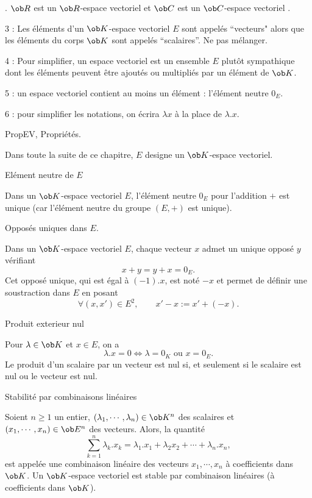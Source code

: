 \Exemple. $\ob R$ est un $\ob R$-espace vectoriel  et  $\ob C$ est un $\ob C$-espace vectoriel . 

\bigskip

\Remarque{} 3 : Les \'el\'ements d'un $\ob K$-espace vectoriel $E$ sont appel\'es ``vecteurs" alors que les \'el\'ements du corps $\ob K$ sont appel\'es ``scalaires''. Ne pas m\'elanger. 
\bigskip

\Remarque{} 4 : Pour simplifier, un espace vectoriel est un ensemble $E$ plut\^ot sympathique dont les \'el\'ements peuvent \^etre ajout\'es ou multipli\'es 
par un \'el\'ement de $\ob K$. 
\bigskip

\Remarque{} 5 : un espace vectoriel contient au moins un \'el\'ement : l'\'el\'ement neutre $0_E$. 
\bigskip

\Remarque{} 6 : pour simplifier les notations, on \'ecrira $\lambda x$ \`a la place de $\lambda.x$. 
\bigskip

\Subsection PropEV, Propri\'et\'es.
\bigskip

\noindent
Dans toute la suite de ce chapitre, $E$ designe un $\ob K$-espace vectoriel. 

\Concept [] El\'ement neutre de $E$

\noindent
Dans un $\ob K$-espace vectoriel $E$, l'\'el\'ement neutre $0_E$ pour l'addition $+$ est unique (car l'\'el\'ement neutre du groupe $(E,+)$ est unique). 

\Concept [] Oppos\'es uniques dans $E$. 

\noindent
Dans un $\ob K$-espace vectoriel $E$, chaque vecteur $x$ admet un unique oppos\'e $y$ v\'erifiant $$
x+y=y+x=0_E.
$$ 
Cet oppos\'e unique, qui est \'egal \`a $(-1).x$, est not\'e $-x$ et permet de d\'efinir une soustraction dans $E$ en posant
$$
\forall (x,x')\in E^2, \qquad x'-x:=x'+(-x).
$$

\Concept [] Produit exterieur nul

\noindent
Pour $\lambda\in\ob K$ et $x\in E$, on a 
$$
{
\lambda.x=0\Longleftrightarrow \lambda=0_K\mbox{ ou }x=0_E}. 
$$
Le produit d'un scalaire par un vecteur est nul si, et seulement si le scalaire est nul ou le vecteur est nul. 
\bigskip

\Concept [] Stabilit\'e par combinaisons lin\'eaires

Soient $n\ge1$ un entier, $(\lambda_1,\cdots,\lambda_n)\in\ob K^n$ des scalaires et $(x_1,\cdots, x_n)\in\ob E^n$ des vecteurs. Alors, la quantit\'e 
$$
{\sum_{k=1}^n\lambda_k.x_k=\lambda_1.x_1+\lambda_2x_2+\cdots+\lambda_n.x_n}, 
$$
est appel\'ee une combinaison lin\'eaire des vecteurs $x_1,\cdots,x_n$ \`a coefficients dans $\ob K$. 
\medskip
Un $\ob K$-espace vectoriel est stable par combinaison lin\'eaires (\`a coefficients dans $\ob K$). 

